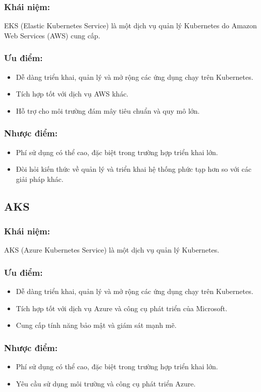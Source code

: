 \subsubsection{Khái niệm:}
\indent EKS (Elastic Kubernetes Service) là một dịch vụ quản lý Kubernetes do Amazon Web Services (AWS) cung cấp.
\subsubsection{Ưu điểm:}
\begin{itemize}
    \item Dễ dàng triển khai, quản lý và mở rộng các ứng dụng chạy trên Kubernetes.
    \item Tích hợp tốt với dịch vụ AWS khác.
    \item Hỗ trợ cho môi trường đám mây tiêu chuẩn và quy mô lớn.
\end{itemize}
\subsubsection{Nhược điểm:}
\begin{itemize}
    \item Phí sử dụng có thể cao, đặc biệt trong trường hợp triển khai lớn.
    \item Đòi hỏi kiến thức về quản lý và triển khai hệ thống phức tạp hơn so với các giải pháp khác.
\end{itemize}
\subsection{AKS}
\subsubsection{Khái niệm:}
\indent AKS (Azure Kubernetes Service) là một dịch vụ quản lý Kubernetes.

\subsubsection{Ưu điểm:}
\begin{itemize}
    \item Dễ dàng triển khai, quản lý và mở rộng các ứng dụng chạy trên Kubernetes.
    \item Tích hợp tốt với dịch vụ Azure và công cụ phát triển của Microsoft.
    \item Cung cấp tính năng bảo mật và giám sát mạnh mẽ.
\end{itemize}
\subsubsection{Nhược điểm:}
\begin{itemize}
    \item Phí sử dụng có thể cao, đặc biệt trong trường hợp triển khai lớn.
    \item Yêu cầu sử dụng môi trường và công cụ phát triển Azure.
\end{itemize}

